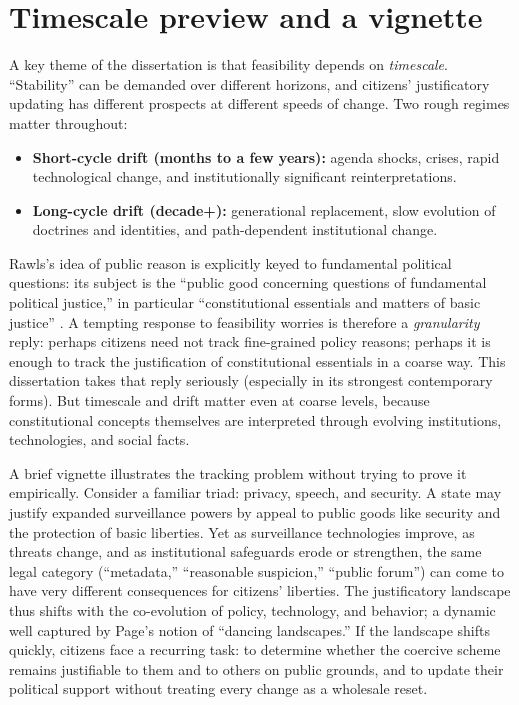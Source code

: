 \documentclass[12pt]{report}
\begin{document}
\section{Timescale preview and a vignette}

A key theme of the dissertation is that feasibility depends on \emph{timescale}.  ``Stability'' can be demanded over different horizons, and citizens' justificatory updating has different prospects at different speeds of change.  Two rough regimes matter throughout:

\begin{itemize}
  \item \textbf{Short-cycle drift (months to a few years):} agenda shocks, crises, rapid technological change, and institutionally significant reinterpretations.
  \item \textbf{Long-cycle drift (decade+):} generational replacement, slow evolution of doctrines and identities, and path-dependent institutional change.
\end{itemize}

Rawls's idea of public reason is explicitly keyed to fundamental political questions: its subject is the ``public good concerning questions of fundamental political justice,'' in particular ``constitutional essentials and matters of basic justice'' \parencite[p.~767]{rawls1997public}.  A tempting response to feasibility worries is therefore a \emph{granularity} reply: perhaps citizens need not track fine-grained policy reasons; perhaps it is enough to track the justification of constitutional essentials in a coarse way.  This dissertation takes that reply seriously (especially in its strongest contemporary forms).  But timescale and drift matter even at coarse levels, because constitutional concepts themselves are interpreted through evolving institutions, technologies, and social facts.

A brief vignette illustrates the tracking problem without trying to prove it empirically.  Consider a familiar triad: privacy, speech, and security.  A state may justify expanded surveillance powers by appeal to public goods like security and the protection of basic liberties.  Yet as surveillance technologies improve, as threats change, and as institutional safeguards erode or strengthen, the same legal category (``metadata,'' ``reasonable suspicion,'' ``public forum'') can come to have very different consequences for citizens' liberties.  The justificatory landscape thus shifts with the co-evolution of policy, technology, and behavior; a dynamic well captured by Page's notion of ``dancing landscapes.''  If the landscape shifts quickly, citizens face a recurring task: to determine whether the coercive scheme remains justifiable to them and to others on public grounds, and to update their political support without treating every change as a wholesale reset.
\end{document}
